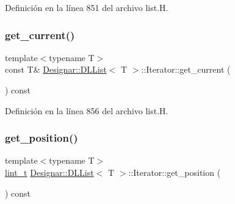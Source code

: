 Definición en la línea 851 del archivo list.\+H.

\mbox{\label{class_designar_1_1_d_l_list_1_1_iterator_a337833cfd046d1b1e69e9af95bdc3280}} 
\subsubsection{\texorpdfstring{get\+\_\+current()}{get\_current()}\hspace{0.1cm}{\footnotesize\ttfamily [2/2]}}
{\footnotesize\ttfamily template$<$typename T$>$ \\
const T\& \hyperlink{class_designar_1_1_d_l_list}{Designar\+::\+D\+L\+List}$<$ T $>$\+::Iterator\+::get\+\_\+current (\begin{DoxyParamCaption}{ }\end{DoxyParamCaption}) const\hspace{0.3cm}{\ttfamily [inline]}}



Definición en la línea 856 del archivo list.\+H.

\mbox{\label{class_designar_1_1_d_l_list_1_1_iterator_acf69183ba9dedd6fdb7dee8854cfce17}} 
\subsubsection{\texorpdfstring{get\+\_\+position()}{get\_position()}}
{\footnotesize\ttfamily template$<$typename T$>$ \\
\hyperlink{namespace_designar_a9d113d66a39e82b73727c72cd3a52f73}{lint\+\_\+t} \hyperlink{class_designar_1_1_d_l_list}{Designar\+::\+D\+L\+List}$<$ T $>$\+::Iterator\+::get\+\_\+position (\begin{DoxyParamCaption}{ }\end{DoxyParamCaption}) const\hspace{0.3cm}{\ttfamily [inline]}}



